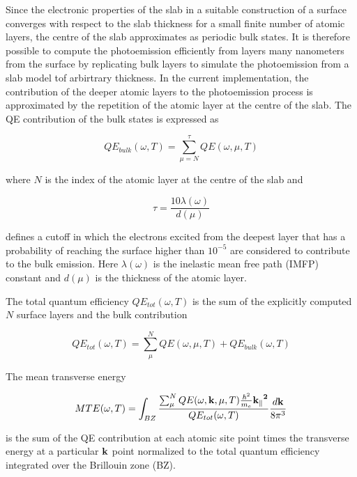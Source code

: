 \documentclass[a4paper,11pt,twoside]{book}
\begin{document}
Since the electronic properties of the slab in a suitable construction of a surface converges with respect to the slab thickness for a small finite number of atomic layers, the centre of the slab approximates as periodic bulk states. It is therefore possible to compute the photoemission efficiently from layers many nanometers from the surface by replicating bulk layers to simulate the photoemission from a slab model tof arbirtrary thickness. In the current implementation, the contribution of the deeper atomic layers to the photoemission process is approximated by the repetition of the atomic layer at the centre of the slab. The QE contribution of the bulk states is expressed as

\begin{equation}
QE_{bulk}(\omega,T) = \sum^{\tau}_{\mu = N} QE(\omega,\mu,T)
    \label{QE_bulk}
\end{equation}

where $N$ is the index of the atomic layer at the centre of the slab and

\begin{equation}
\tau = \frac{10\lambda(\omega)}{d(\mu)}
    \label{QE_bulk}
\end{equation}

defines a cutoff in which the electrons excited from the deepest layer that has a probability of reaching the surface higher than $10^{-5}$ are considered to contribute to the bulk emission. Here $\lambda(\omega)$ is the inelastic mean free path (IMFP) constant and $d(\mu)$ is the thickness of the atomic layer.

The total quantum efficiency $QE_{tot}{( \omega, T)}$ is the sum of the explicitly computed $N$ surface layers and the bulk contribution

\begin{equation}
QE_{tot}( \omega , T)= \sum_{\mu}^N  QE{( \omega ,\mu, T)} + QE_{bulk}(\omega,T)
    \label{total_qe}
\end{equation}

The mean transverse energy

\begin{equation}
MTE(\omega, T) =\int_{BZ} \frac{\sum_{\mu}^N{QE(\omega,{\bf{k}},\mu, T)}\frac{\hbar^2}{m_e}\bf{k_{\parallel}}^2}{QE_{tot}( \omega , T)} \frac{d{\bf{k}}}{8\pi^3}
    \label{total_qe}
\end{equation}

is the sum of the QE contribution at each atomic site point times the transverse energy at a particular $\bf{k}$ point normalized to the total quantum efficiency integrated over the Brillouin zone (BZ).
\end{document}
